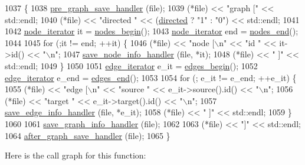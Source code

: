 \begin{DoxyCode}
1037                                        \{
1038     \mbox{\hyperlink{classgraph_ab257e02f6fd04fef244032a3a15bec9f}{pre\_graph\_save\_handler}} (file);
1039     (*file) << \textcolor{stringliteral}{"graph ["} << std::endl;
1040     (*file) << \textcolor{stringliteral}{"directed "} << (\mbox{\hyperlink{classgraph_ab4120df210eb3d03d20b0bd27f8cbe8c}{directed}} ? \textcolor{stringliteral}{"1"} : \textcolor{stringliteral}{"0"}) << std::endl;
1041 
1042     \mbox{\hyperlink{classgraph_a2cb374b84c133ce13f94e73c3e5da7fa}{node\_iterator}} it = \mbox{\hyperlink{classgraph_aec053a4b509d1be804237a80044c54c0}{nodes\_begin}}();
1043     \mbox{\hyperlink{classgraph_a2cb374b84c133ce13f94e73c3e5da7fa}{node\_iterator}} end = \mbox{\hyperlink{classgraph_abbf9c0cb5629e98e1142254911238173}{nodes\_end}}();
1044 
1045     \textcolor{keywordflow}{for} (;it != end; ++it) \{
1046     (*file) << \textcolor{stringliteral}{"node [\(\backslash\)n"} << \textcolor{stringliteral}{"id "} << it->id() << \textcolor{stringliteral}{"\(\backslash\)n"};
1047     \mbox{\hyperlink{classgraph_a994f87e1b7f1f723cf03e54e2eb7a99d}{save\_node\_info\_handler}} (file, *it);
1048     (*file) << \textcolor{stringliteral}{" ]"} << std::endl;
1049     \}
1050 
1051     \mbox{\hyperlink{classgraph_a818d3766018eb0af91d520ce2150203c}{edge\_iterator}} e\_it = \mbox{\hyperlink{classgraph_a7ba35a4c4e8343ffb27ed6d9703c6f18}{edges\_begin}}();
1052     \mbox{\hyperlink{classgraph_a818d3766018eb0af91d520ce2150203c}{edge\_iterator}} e\_end = \mbox{\hyperlink{classgraph_aea8d7f976b85b6137f52d915e26639f6}{edges\_end}}();
1053     
1054     \textcolor{keywordflow}{for} (; e\_it != e\_end; ++e\_it) \{
1055     (*file) << \textcolor{stringliteral}{"edge [\(\backslash\)n"} << \textcolor{stringliteral}{"source "} << e\_it->source().id() << \textcolor{stringliteral}{"\(\backslash\)n"};
1056     (*file) << \textcolor{stringliteral}{"target "} << e\_it->target().id() << \textcolor{stringliteral}{"\(\backslash\)n"};
1057     \mbox{\hyperlink{classgraph_a37bb8d0951691e37cdfb271229960f9c}{save\_edge\_info\_handler}} (file, *e\_it);
1058     (*file) << \textcolor{stringliteral}{" ]"} << std::endl;
1059     \}
1060 
1061     \mbox{\hyperlink{classgraph_a0f20022d6f4951b8836a204aa85b7693}{save\_graph\_info\_handler}} (file);
1062 
1063     (*file) << \textcolor{stringliteral}{"]"} << std::endl;
1064     \mbox{\hyperlink{classgraph_af0c7aba21d57d827ae96cae632441651}{after\_graph\_save\_handler}} (file);
1065 \}
\end{DoxyCode}
Here is the call graph for this function\+:
